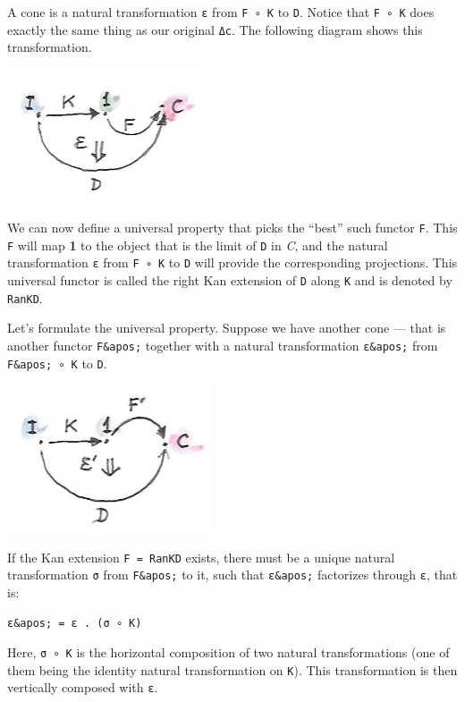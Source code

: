 A cone is a natural transformation \texttt{ε} from \texttt{F\ ∘\ K} to
\texttt{D}. Notice that \texttt{F\ ∘\ K} does exactly the same thing as
our original \texttt{Δc}. The following diagram shows this
transformation.

\includegraphics[width=2.31250in]{images/kan3-e1492120491591.jpg}

We can now define a universal property that picks the ``best'' such
functor \texttt{F}. This \texttt{F} will map \textbf{1} to the object
that is the limit of \texttt{D} in \emph{C}, and the natural
transformation \texttt{ε} from \texttt{F\ ∘\ K} to \texttt{D} will
provide the corresponding projections. This universal functor is called
the right Kan extension of \texttt{D} along \texttt{K} and is denoted by
\texttt{RanKD}.

Let's formulate the universal property. Suppose we have another cone ---
that is another functor \texttt{F\&apos;} together with a natural
transformation \texttt{ε\&apos;} from \texttt{F\&apos;\ ∘\ K} to
\texttt{D}.

\includegraphics[width=2.36458in]{images/kan31-e1492120512209.jpg}

If the Kan extension \texttt{F\ =\ RanKD} exists, there must be a unique
natural transformation \texttt{σ} from \texttt{F\&apos;} to it, such
that \texttt{ε\&apos;} factorizes through \texttt{ε}, that is:

\begin{verbatim}
ε&apos; = ε . (σ ∘ K)
\end{verbatim}

Here, \texttt{σ\ ∘\ K} is the horizontal composition of two natural
transformations (one of them being the identity natural transformation
on \texttt{K}). This transformation is then vertically composed with
\texttt{ε}.

